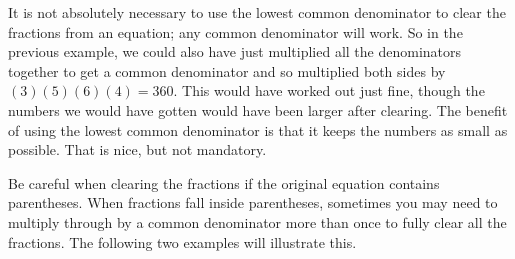 It is not absolutely necessary to use the lowest common denominator to clear the fractions from an equation; any common denominator will work. So in the previous example, we could also have just multiplied all the denominators together to get a common denominator and so multiplied both sides by $(3)(5)(6)(4) = 360$. This would have worked out just fine, though the numbers we would have gotten would have been larger after clearing. The benefit of using the lowest common denominator is that it keeps the numbers as small as possible. That is nice, but not mandatory.

Be careful when clearing the fractions if the original equation contains parentheses. When fractions fall inside parentheses, sometimes you may need to multiply through by a common denominator more than once to fully clear all the fractions. The following two examples will illustrate this.




